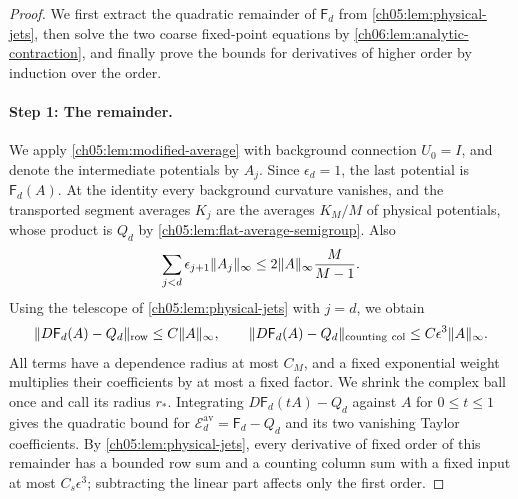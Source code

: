 \begin{proof}
We first extract the quadratic remainder of $\mathsf F_d$ from \cref{ch05:lem:physical-jets}, then solve the two coarse fixed-point equations by \cref{ch06:lem:analytic-contraction}, and finally prove the bounds for derivatives of higher order by induction over the order.

\paragraph{Step 1: The remainder.}
We apply \cref{ch05:lem:modified-average} with background connection $U_0=I$, and denote the intermediate potentials by $A_j$. Since $\epsilon_d=1$, the last potential is $\mathsf F_d(A)$. At the identity every background curvature vanishes, and the transported segment averages $K_j$ are the averages $K_M/M$ of physical potentials, whose product is $Q_d$ by \cref{ch05:lem:flat-average-semigroup}. Also
\[
 \sum_{j<d}\epsilon_{j+1}\lVert A_j\rVert_\infty\le2\lVert A\rVert_\infty\frac M{M-1}.
\]
Using the telescope of \cref{ch05:lem:physical-jets} with $j=d$, we obtain
\begin{equation}\label{ch06:eq:average-remainder-derivative}
 \lVert D\mathsf F_d(A)-Q_d\rVert_{\mathrm{row}}\le C\lVert A\rVert_\infty,\qquad\lVert D\mathsf F_d(A)-Q_d\rVert_{\mathrm{counting\ col}}\le C\epsilon^3\lVert A\rVert_\infty.
\end{equation}
All terms have a dependence radius at most $C_M$, and a fixed exponential weight multiplies their coefficients by at most a fixed factor. We shrink the complex ball once and call its radius $r_*$. Integrating $D\mathsf F_d(tA)-Q_d$ against $A$ for $0\le t\le1$ gives the quadratic bound for $\mathscr E_d^{\mathrm{av}}=\mathsf F_d-Q_d$ and its two vanishing Taylor coefficients. By \cref{ch05:lem:physical-jets}, every derivative of fixed order of this remainder has a bounded row sum and a counting column sum with a fixed input at most $C_s\epsilon^3$; subtracting the linear part affects only the first order.


\end{proof}
